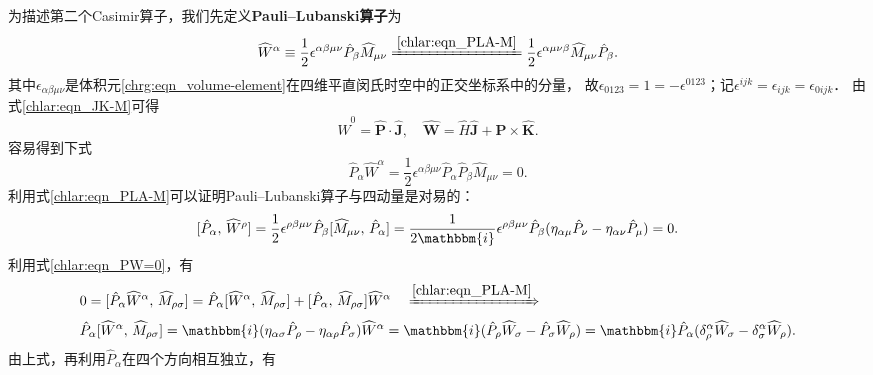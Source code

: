 为描述第二个Casimir算子，我们先定义{\bfseries\heiti Pauli--Lubanski算子}为
\begin{equation}\label{chlar:eqn_Pauli-Lubanski}
	\widehat{W}^\alpha \equiv \frac{1}{2}\epsilon^{\alpha\beta\mu\nu}\hat{P}_\beta \widehat{M}_{\mu\nu}
	\xlongequal{\ref{chlar:eqn_PLA-M}} \frac{1}{2}\epsilon^{\alpha\mu\nu\beta} \widehat{M}_{\mu\nu} \hat{P}_\beta  .
\end{equation}
其中$\epsilon_{\alpha\beta\mu\nu}$是体积元\eqref{chrg:eqn_volume-element}在四维平直闵氏时空中的正交坐标系中的分量，
故$\epsilon_{0123}=1=-\epsilon^{0123}$；记$\epsilon^{ijk}=\epsilon_{ijk}=\epsilon_{0ijk}$．
由式\eqref{chlar:eqn_JK-M}可得
\begin{equation}\label{chlar:eqn_Pauli-Lubanski-comp}
	\widehat{W}^0 = \boldsymbol{\hat{P}}\cdot \boldsymbol{\hat{J}},\quad
	\boldsymbol{\widehat{W}} =  \hat{H} \boldsymbol{\hat{J}} + \boldsymbol{\hat{P}}\times \boldsymbol{\hat{K}}.
\end{equation}
容易得到下式
\begin{equation}\label{chlar:eqn_PW=0}
	\hat{P}_\alpha \widehat{W}^\alpha = \frac{1}{2}\epsilon^{\alpha\beta\mu\nu}\hat{P}_\alpha \hat{P}_\beta \widehat{M}_{\mu\nu}=0 .
\end{equation}
利用式\eqref{chlar:eqn_PLA-M}可以证明Pauli--Lubanski算子与四动量是对易的：
\begin{equation}\label{chlar:eqn_PWWP=0}
	[\hat{P}_\alpha,\, \widehat{W}^\rho] = 
	\frac{1}{2}\epsilon^{\rho\beta\mu\nu} \hat{P}_\beta [ \widehat{M}_{\mu\nu},\, \hat{P}_\alpha]
	=\frac{1}{2\mathbbm{i}}\epsilon^{\rho\beta\mu\nu} \hat{P}_\beta 
	(\eta_{\alpha \mu} \hat{P}_\nu-\eta_{\alpha \nu} \hat{P}_\mu ) =0.    
\end{equation}
利用式\eqref{chlar:eqn_PW=0}，有
\begin{align*}
	&0=[\hat{P}_\alpha \widehat{W}^\alpha,\, \widehat{M}_{\rho \sigma} ]
	=\hat{P}_\alpha [ \widehat{W}^\alpha,\, \widehat{M}_{\rho \sigma} ]
	+[\hat{P}_\alpha ,\, \widehat{M}_{\rho \sigma} ]\widehat{W}^\alpha 
	\quad \xRightarrow{\ref{chlar:eqn_PLA-M}} \\
	&\hat{P}_\alpha [ \widehat{W}^\alpha,\, \widehat{M}_{\rho \sigma} ]= \mathbbm{i}
	(\eta_{\alpha \sigma} \hat{P}_\rho-\eta_{\alpha \rho} \hat{P}_\sigma)\widehat{W}^\alpha
	= \mathbbm{i} (\hat{P}_\rho \widehat{W}_\sigma-\hat{P}_\sigma \widehat{W}_\rho)
	=\mathbbm{i} \hat{P}_\alpha (\delta_\rho^\alpha \widehat{W}_\sigma -\delta_\sigma^\alpha \widehat{W}_\rho) .
\end{align*}
由上式，再利用$\hat{P}_\alpha$在四个方向相互独立，有
